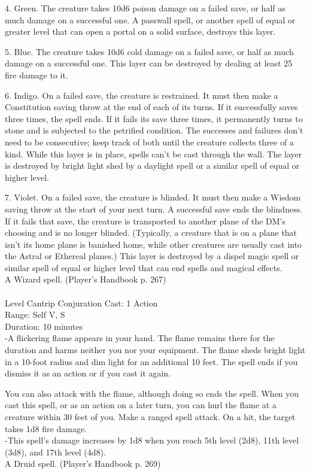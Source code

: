 \documentclass[10pt,twocolumn]{report}
\begin{document}
4. Green. The creature takes 10d6 poison damage on a failed save, or half as much damage on a successful one. A passwall spell, or another spell of equal or greater level that can open a portal on a solid surface, destroys this layer.

5. Blue. The creature takes 10d6 cold damage on a failed save, or half as much damage on a successful one. This layer can be destroyed by dealing at least 25 fire damage to it.

6. Indigo. On a failed save, the creature is restrained. It must then make a Constitution saving throw at the end of each of its turns. If it successfully saves three times, the spell ends. If it fails its save three times, it permanently turns to stone and is subjected to the petrified condition. The successes and failures don’t need to be consecutive; keep track of both until the creature collects three of a kind. While this layer is in place, spells can’t be cast through the wall. The layer is destroyed by bright light shed by a daylight spell or a similar spell of equal or higher level.

7. Violet. On a failed save, the creature is blinded. It must then make a Wisdom saving throw at the start of your next turn. A successful save ends the blindness. If it fails that save, the creature is transported to another plane of the DM’s choosing and is no longer blinded. (Typically, a creature that is on a plane that isn’t its home plane is banished home, while other creatures are usually cast into the Astral or Ethereal planes.) This layer is destroyed by a dispel magic spell or similar spell of equal or higher level that can end spells and magical effects.\\
A Wizard spell. (Player's Handbook p. 267) \\


 \\
Level Cantrip \quad Conjuration \quad Cast: 1 Action\\
Range: Self \quad V, S\\
Duration: 10 minutes \quad \\
-A flickering flame appears in your hand.
The flame remains there for the duration and harms neither you nor your equipment. The flame sheds bright light in a 10-foot radius and dim light for an additional 10 feet. The spell ends if you dismiss it as an action or if you cast it again.

You can also attack with the flame, although doing so ends the spell. When you cast this spell, or as an action on a later turn, you can hurl the flame at a creature within 30 feet of you. Make a ranged spell attack. On a hit, the target takes 1d8 fire damage.\\
-This spell’s damage increases by 1d8 when you reach 5th level (2d8), 11th level (3d8), and 17th level (4d8).\\
A Druid spell. (Player's Handbook p. 269) \\
\end{document}
